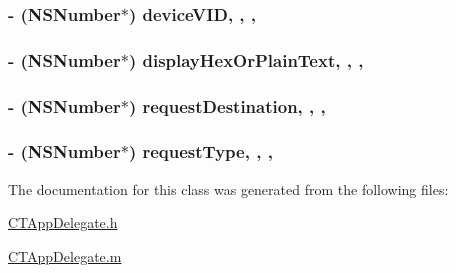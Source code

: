 \hypertarget{interface_c_t_app_delegate_ac3f78415dd122de7cebf7a3745a69da9}{
\subsubsection[{device\-V\-I\-D}]{\setlength{\rightskip}{0pt plus 5cm}-\/ (N\-S\-Number$\ast$) device\-V\-I\-D\hspace{0.3cm}{\ttfamily [read]}, {\ttfamily [write]}, {\ttfamily [atomic]}, {\ttfamily [copy]}}}\label{interface_c_t_app_delegate_ac3f78415dd122de7cebf7a3745a69da9}
\hypertarget{interface_c_t_app_delegate_a4578b9f0c04d7376bde881085bad233a}{
\subsubsection[{display\-Hex\-Or\-Plain\-Text}]{\setlength{\rightskip}{0pt plus 5cm}-\/ (N\-S\-Number$\ast$) display\-Hex\-Or\-Plain\-Text\hspace{0.3cm}{\ttfamily [read]}, {\ttfamily [write]}, {\ttfamily [atomic]}, {\ttfamily [copy]}}}\label{interface_c_t_app_delegate_a4578b9f0c04d7376bde881085bad233a}
\hypertarget{interface_c_t_app_delegate_a91630675dd1cdd1844fdd217ce52bf86}{
\subsubsection[{request\-Destination}]{\setlength{\rightskip}{0pt plus 5cm}-\/ (N\-S\-Number$\ast$) request\-Destination\hspace{0.3cm}{\ttfamily [read]}, {\ttfamily [write]}, {\ttfamily [atomic]}, {\ttfamily [copy]}}}\label{interface_c_t_app_delegate_a91630675dd1cdd1844fdd217ce52bf86}
\hypertarget{interface_c_t_app_delegate_ae0366c6888903dc8247ecf1f2dacc69d}{
\subsubsection[{request\-Type}]{\setlength{\rightskip}{0pt plus 5cm}-\/ (N\-S\-Number$\ast$) request\-Type\hspace{0.3cm}{\ttfamily [read]}, {\ttfamily [write]}, {\ttfamily [atomic]}, {\ttfamily [copy]}}}\label{interface_c_t_app_delegate_ae0366c6888903dc8247ecf1f2dacc69d}


The documentation for this class was generated from the following files\-:\begin{DoxyCompactItemize}
\item 
\hyperlink{_c_t_app_delegate_8h}{C\-T\-App\-Delegate.\-h}\item 
\hyperlink{_c_t_app_delegate_8m}{C\-T\-App\-Delegate.\-m}\end{DoxyCompactItemize}

